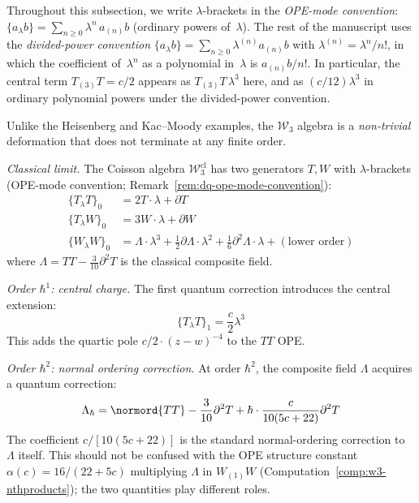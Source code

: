 \begin{remark}
\label{rem:dq-ope-mode-convention}
Throughout this subsection, we write $\lambda$-brackets
in the \emph{OPE-mode convention}:
$\{a_\lambda b\} = \sum_{n \geq 0} \lambda^n \, a_{(n)}b$
(ordinary powers of~$\lambda$). The rest of the manuscript
uses the \emph{divided-power convention}
$\{a_\lambda b\} = \sum_{n \geq 0} \lambda^{(n)} a_{(n)}b$
with $\lambda^{(n)} = \lambda^n/n!$, in which the coefficient
of~$\lambda^n$ as a polynomial in~$\lambda$ is $a_{(n)}b/n!$.
In particular, the central term $T_{(3)}T = c/2$ appears
as $T_{(3)}T\,\lambda^3$ here, and as $(c/12)\lambda^3$ in
ordinary polynomial powers under the divided-power convention.
\end{remark}

\begin{computation}
\label{comp:w-algebra-deformation}

Unlike the Heisenberg and Kac--Moody examples, the $\mathcal{W}_3$
algebra is a \emph{non-trivial} deformation that does not terminate
at any finite order.

\emph{Classical limit.}
The Coisson algebra $\mathcal{W}_3^{\mathrm{cl}}$ has two
generators $T, W$ with $\lambda$-brackets
(OPE-mode convention; Remark~\ref{rem:dq-ope-mode-convention}):
\begin{align}
\{T_\lambda T\}_0 &= 2T \cdot \lambda + \partial T
\label{eq:w3-poisson-TT} \\
\{T_\lambda W\}_0 &= 3W \cdot \lambda + \partial W
\label{eq:w3-poisson-TW} \\
\{W_\lambda W\}_0 &= \Lambda \cdot \lambda^3
+ \frac{1}{2}\partial\Lambda \cdot \lambda^2
+ \frac{1}{6}\partial^2\Lambda \cdot \lambda
+ (\text{lower order})
\label{eq:w3-poisson-WW}
\end{align}
where $\Lambda = TT - \frac{3}{10}\partial^2 T$ is the
classical composite field.

\emph{Order $\hbar^1$: central charge.}
The first quantum correction introduces the central extension:
\[
\{T_\lambda T\}_1 = \frac{c}{2}\lambda^3
\]
This adds the quartic pole $c/2 \cdot (z-w)^{-4}$ to the $TT$ OPE.

\emph{Order $\hbar^2$: normal ordering correction.}
At order $\hbar^2$, the composite field $\Lambda$ acquires a
quantum correction:
\[
\Lambda_\hbar = \normord{TT}
- \frac{3}{10}\partial^2 T
+ \hbar \cdot \frac{c}{10(5c + 22)}\partial^2 T
\]
The coefficient $c/[10(5c + 22)]$ is the
standard normal-ordering correction to $\Lambda$ itself.
This should not be confused with the OPE structure constant
$\alpha(c) = 16/(22+5c)$ multiplying $\Lambda$ in $W_{(1)}W$
(Computation~\ref{comp:w3-nthproducts}); the two quantities play
different roles.


\end{computation}
